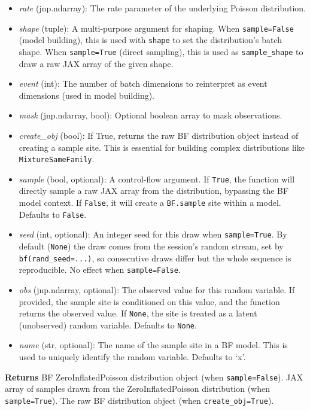 \documentclass[
  letterpaper,
  DIV=11,
  numbers=noendperiod]{scrartcl}
\begin{document}
\begin{itemize}
\item
  \emph{rate} (jnp.ndarray): The rate parameter of the underlying
  Poisson distribution.
\item
  \emph{shape} (tuple): A multi-purpose argument for shaping. When
  \texttt{sample=False} (model building), this is used with
  \texttt{shape} to set the distribution's batch shape. When
  \texttt{sample=True} (direct sampling), this is used as
  \texttt{sample\_shape} to draw a raw JAX array of the given shape.
\item
  \emph{event} (int): The number of batch dimensions to reinterpret as
  event dimensions (used in model building).
\item
  \emph{mask} (jnp.ndarray, bool): Optional boolean array to mask
  observations.
\item
  \emph{create\_obj} (bool): If True, returns the raw BF distribution
  object instead of creating a sample site. This is essential for
  building complex distributions like \texttt{MixtureSameFamily}.
\item
  \emph{sample} (bool, optional): A control-flow argument. If
  \texttt{True}, the function will directly sample a raw JAX array from
  the distribution, bypassing the BF model context. If \texttt{False},
  it will create a \texttt{BF.sample} site within a model. Defaults to
  \texttt{False}.
\item
  \emph{seed} (int, optional): An integer seed for this draw when
  \texttt{sample=True}. By default (\texttt{None}) the draw comes from
  the session's random stream, set by \texttt{bf(rand\_seed=...)}, so
  consecutive draws differ but the whole sequence is reproducible. No
  effect when \texttt{sample=False}.
\item
  \emph{obs} (jnp.ndarray, optional): The observed value for this random
  variable. If provided, the sample site is conditioned on this value,
  and the function returns the observed value. If \texttt{None}, the
  site is treated as a latent (unobserved) random variable. Defaults to
  \texttt{None}.
\item
  \emph{name} (str, optional): The name of the sample site in a BF
  model. This is used to uniquely identify the random variable. Defaults
  to `x'.
\end{itemize}

\textbf{Returns} BF ZeroInflatedPoisson distribution object (when
\texttt{sample=False}). JAX array of samples drawn from the
ZeroInflatedPoisson distribution (when \texttt{sample=True}). The raw BF
distribution object (when \texttt{create\_obj=True}).
\end{document}
